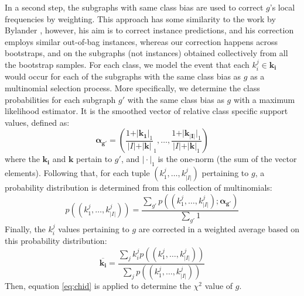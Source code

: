 \documentclass{article}
\begin{document}
In a second step, the subgraphs with same class bias are used to correct $g$'s
local frequencies by weighting. This approach has some similarity to the work
by Bylander \cite{bylander02estimating}, however, his aim is to correct
instance predictions, and his correction employs similar out-of-bag instances,
whereas our correction happens across bootstraps, and on the subgraphs (not
instances) obtained collectively from all the bootstrap samples.  For each
class, we model the event that each $k_i^j \in \mathbf{k_i}$ would occur for
each of the subgraphs with the same class bias as $g$ as a multinomial
selection process.  More specifically, we determine the class probabilities for
each subgraph $g'$ with the same class bias as $g$ with a maximum
likelihood estimator. It is the smoothed vector of relative class specific support
values, defined as:
\begin{equation}
  \mathbf{\alpha_{g'}} = \left(\frac{1+\vert\mathbf{k_1}\vert_1}{\vert I\vert+\vert\mathbf{k}\vert}_1,\ldots,\frac{1+\vert\mathbf{k_{\vert I\vert}}\vert_1}{\vert I\vert+\vert\mathbf{k}\vert_1}\right)
  \label{eqn:mlexpr}
\end{equation}
where the $\mathbf{k_i}$ and $\mathbf{k}$ pertain to $g'$, and $\vert\cdot\vert_1$ is the one-norm (the sum of the vector elements). Following that, for
each tuple $(k_1^j,\ldots,k_{\vert I\vert}^j)$ pertaining to $g$, a probability distribution is
determined from this collection of multinomials:
\begin{equation}
  p((k_1^j,\ldots,k_{\vert I\vert}^j))=\frac{\sum_{g'} p((k_1^j,\ldots,k_{\vert I\vert}^j); \mathbf{\alpha_{g'}})}{\sum_{g'}1}
  \label{eqn:avgpr}
\end{equation}
Finally, the $k_i^j$ values pertaining to $g$ are corrected in a weighted average
based on this probability distribution:
\begin{equation}
  \overline{\mathbf{k_i}}=\frac{\sum_j k_i^j p((k_1^j,\ldots,k_{\vert I\vert}^j))}{\sum_j p((k_1^j,\ldots,k_{\vert I\vert}^j))}
  \label{eqn:avgki}
\end{equation}
Then, equation \ref{eq:chid} is applied to determine the $\chi^2$ value of $g$.
\end{document}
